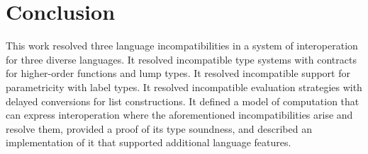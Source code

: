 \section{Conclusion}

This work resolved three language incompatibilities in a system of interoperation for three diverse languages.  It resolved incompatible type systems with contracts for higher-order functions and lump types.  It resolved incompatible support for parametricity with label types.  It resolved incompatible evaluation strategies with delayed conversions for list constructions.  It defined a model of computation that can express interoperation where the aforementioned incompatibilities arise and resolve them, provided a proof of its type soundness, and described an implementation of it that supported additional language features.
